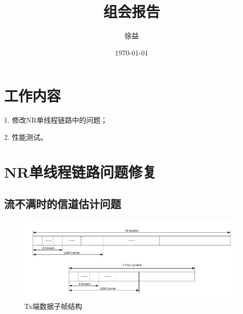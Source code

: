 \documentclass{article}
\title{组会报告}
\author{徐益}
\date{\today}
\begin{document}
\maketitle


\section{工作内容} 
1. 修改NR单线程链路中的问题；

2. 性能测试。

\section{NR单线程链路问题修复}
\subsection{流不满时的信道估计问题}
\begin{figure}[H]
	\centering
	\includegraphics[width = \textwidth]{data.pdf}
	\caption{Tx端数据子帧结构}
\end{figure}
\end{document}
